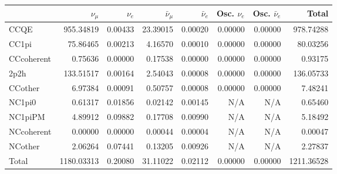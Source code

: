 \begin{tabular} { | l ||r | r | r | r | r | r | | r | }
\hline
              & $\nu_\mu$            & $\nu_e$              & $\bar{\nu}_{\mu}$    & $\bar{\nu}_{e}$      & Osc. $\nu_e$         & Osc. $\bar{\nu}_{e}$ & Total                \\ \hline\hline
 CCQE         & 955.34819            & 0.00433              & 23.39015             & 0.00020              & 0.00000              & 0.00000              & 978.74288            \\ \hline
 CC1pi        & 75.86465             & 0.00213              & 4.16570              & 0.00010              & 0.00000              & 0.00000              & 80.03256             \\ \hline
 CCcoherent   & 0.75636              & 0.00000              & 0.17538              & 0.00000              & 0.00000              & 0.00000              & 0.93175              \\ \hline
 2p2h         & 133.51517            & 0.00164              & 2.54043              & 0.00008              & 0.00000              & 0.00000              & 136.05733            \\ \hline
 CCother      & 6.97384              & 0.00091              & 0.50757              & 0.00008              & 0.00000              & 0.00000              & 7.48241              \\ \hline
 NC1pi0       & 0.61317              & 0.01856              & 0.02142              & 0.00145              & N/A                  & N/A                  & 0.65460              \\ \hline
 NC1piPM      & 4.89912              & 0.09882              & 0.17708              & 0.00990              & N/A                  & N/A                  & 5.18492              \\ \hline
 NCcoherent   & 0.00000              & 0.00000              & 0.00044              & 0.00004              & N/A                  & N/A                  & 0.00047              \\ \hline
 NCother      & 2.06264              & 0.07441              & 0.13205              & 0.00926              & N/A                  & N/A                  & 2.27837              \\ \hline
\hline
 Total        & 1180.03313           & 0.20080              & 31.11022             & 0.02112              & 0.00000              & 0.00000              & 1211.36528           \\ \hline

\end{tabular}
